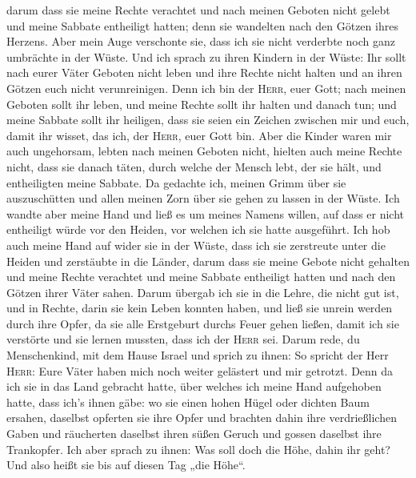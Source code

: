  darum dass sie meine Rechte verachtet und nach meinen
Geboten nicht gelebt und meine Sabbate entheiligt hatten; denn sie
wandelten nach den Götzen ihres Herzens.  Aber mein Auge
verschonte sie, dass ich sie nicht verderbte noch ganz umbrächte in der
Wüste.  Und ich sprach zu ihren Kindern in der Wüste: Ihr
sollt nach eurer Väter Geboten nicht leben und ihre Rechte nicht halten
und an ihren Götzen euch nicht verunreinigen.  Denn ich
bin der \textsc{Herr}, euer Gott; nach meinen Geboten sollt ihr leben,
und meine Rechte sollt ihr halten und danach tun;  und
meine Sabbate sollt ihr heiligen, dass sie seien ein Zeichen zwischen
mir und euch, damit ihr wisset, das ich, der \textsc{Herr}, euer Gott
bin.  Aber die Kinder waren mir auch ungehorsam, lebten
nach meinen Geboten nicht, hielten auch meine Rechte nicht, dass sie
danach täten, durch welche der Mensch lebt, der sie hält, und
entheiligten meine Sabbate. Da gedachte ich, meinen Grimm über sie
auszuschütten und allen meinen Zorn über sie gehen zu lassen in der
Wüste.  Ich wandte aber meine Hand und ließ es um meines
Namens willen, auf dass er nicht entheiligt würde vor den Heiden, vor
welchen ich sie hatte ausgeführt.  Ich hob auch meine
Hand auf wider sie in der Wüste, dass ich sie zerstreute unter die
Heiden und zerstäubte in die Länder,  darum dass sie
meine Gebote nicht gehalten und meine Rechte verachtet und meine Sabbate
entheiligt hatten und nach den Götzen ihrer Väter sahen. 
Darum übergab ich sie in die Lehre, die nicht gut ist, und in Rechte,
darin sie kein Leben konnten haben,  und ließ sie unrein
werden durch ihre Opfer, da sie alle Erstgeburt durchs Feuer gehen
ließen, damit ich sie verstörte und sie lernen mussten, dass ich der
\textsc{Herr} sei.  Darum rede, du Menschenkind, mit dem
Hause Israel und sprich zu ihnen: So spricht der Herr \textsc{Herr}:
Eure Väter haben mich noch weiter gelästert und mir getrotzt.
 Denn da ich sie in das Land gebracht hatte, über welches
ich meine Hand aufgehoben hatte, dass ich's ihnen gäbe: wo sie einen
hohen Hügel oder dichten Baum ersahen, daselbst opferten sie ihre Opfer
und brachten dahin ihre verdrießlichen Gaben und räucherten daselbst
ihren süßen Geruch und gossen daselbst ihre Trankopfer. 
Ich aber sprach zu ihnen: Was soll doch die Höhe, dahin ihr geht? Und
also heißt sie bis auf diesen Tag „die Höhe``.

